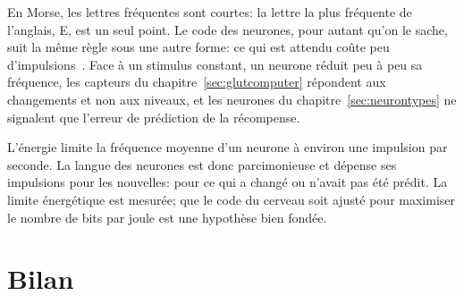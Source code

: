 En Morse, les lettres fréquentes sont courtes: la lettre la plus fréquente de l'anglais, E, est un seul point. Le code des neurones, pour autant qu'on le sache, suit la même règle sous une autre forme: ce qui est attendu coûte peu d'impulsions~\cite{Barlow1961}. Face à un stimulus constant, un neurone réduit peu à peu sa fréquence, les capteurs du chapitre~\ref{sec:glutcomputer} répondent aux changements et non aux niveaux, et les neurones  du chapitre~\ref{sec:neurontypes} ne signalent que l'erreur de prédiction de la récompense.

\begin{keyblock}
\begin{proposition}[Économie]
\label{prop:economy}
L'énergie limite la fréquence moyenne d'un neurone à environ une impulsion par seconde. La langue des neurones  est donc parcimonieuse et dépense ses impulsions pour les nouvelles: pour ce qui a changé ou n'avait pas été prédit. La limite énergétique est mesurée; que le code du cerveau soit ajusté pour maximiser le nombre de bits par joule est une hypothèse bien fondée.
\end{proposition}
\end{keyblock}

\section{Bilan}


